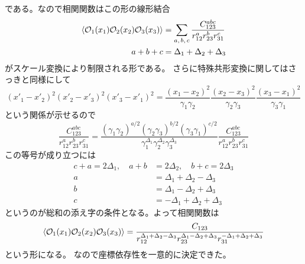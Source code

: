 \documentclass[../../master.tex]{subfiles}
\begin{document}
である。なので相関関数はこの形の線形結合
\begin{align}
    \ev{\mathcal{O}_1(x_1)\mathcal{O}_2(x_2)\mathcal{O}_3(x_3)}
        &= \sum_{a,\,b,\,c}\frac{C_{123}^{abc}}{r_{12}^a r_{23}^b r_{31}^c}\\
    a+b+c &=\Delta_1+\Delta_2+\Delta_3
\end{align}
がスケール変換により制限される形である。
さらに特殊共形変換に関してはさっきと同様にして
\begin{equation*}
    (x'_1-x'_2)^2(x'_2-x'_3)^2(x'_3-x'_1)^2 = \frac{(x_1-x_2)^2}{\gamma_1 \gamma_2}\frac{(x_2-x_3)^2}{\gamma_2 \gamma_3}\frac{(x_3-x_1)^2}{\gamma_3 \gamma_1}
\end{equation*}
という関係が示せるので
\begin{equation}
    \frac{C_{123}^{abc}}{r_{12}^a r_{23}^b r_{31}^c}
    = \frac{(\gamma_1\gamma_2)^{a/2}(\gamma_2\gamma_3)^{b/2}(\gamma_3\gamma_1)^{c/2}}{\gamma_1^{\Delta_1}\gamma_2^{\Delta_2}\gamma_3^{\Delta_3}}\frac{C_{123}^{abc}}{r_{12}^a r_{23}^b r_{31}^c}
\end{equation}
この等号が成り立つには
\begin{align}
    c+a = 2\Delta_1, \quad a+b &= 2\Delta_2, \quad b+c = 2\Delta_3 \\
    a &= \Delta_1 + \Delta_2 - \Delta_3\\
    b &= \Delta_1 - \Delta_2 + \Delta_3\\
    c &=-\Delta_1 + \Delta_2 + \Delta_3
\end{align}
というのが総和の添え字の条件となる。よって相関関数は
\begin{equation}
    \ev{\mathcal{O}_1(x_1)\mathcal{O}_2(x_2)\mathcal{O}_3(x_3)} = \frac{C_{123}}{r_{12}^{\Delta_1+\Delta_2-\Delta_3} r_{23}^{\Delta_1-\Delta_2+\Delta_3} r_{31}^{-\Delta_1+\Delta_2+\Delta_3}}\\
\end{equation}
という形になる。
なので座標依存性を一意的に決定できた。
\end{document}
